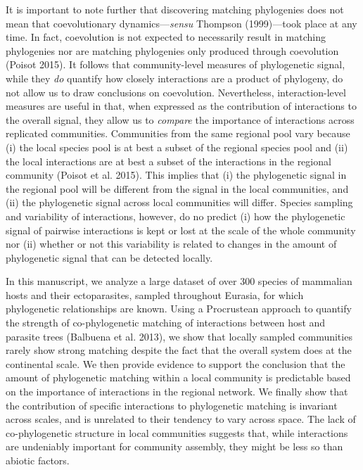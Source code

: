 \documentclass[11pt,serif]{article}
\begin{document}
It is important to note further that discovering matching phylogenies
does not mean that coevolutionary dynamics---\emph{sensu} Thompson
(1999)---took place at any time. In fact, coevolution is not expected to
necessarily result in matching phylogenies nor are matching phylogenies
only produced through coevolution (Poisot 2015). It follows that
community-level measures of phylogenetic signal, while they \emph{do}
quantify how closely interactions are a product of phylogeny, do not
allow us to draw conclusions on coevolution. Nevertheless,
interaction-level measures are useful in that, when expressed as the
contribution of interactions to the overall signal, they allow us to
\emph{compare} the importance of interactions across replicated
communities. Communities from the same regional pool vary because (i)
the local species pool is at best a subset of the regional species pool
and (ii) the local interactions are at best a subset of the interactions
in the regional community (Poisot et al. 2015). This implies that (i)
the phylogenetic signal in the regional pool will be different from the
signal in the local communities, and (ii) the phylogenetic signal across
local communities will differ. Species sampling and variability of
interactions, however, do no predict (i) how the phylogenetic signal of
pairwise interactions is kept or lost at the scale of the whole
community nor (ii) whether or not this variability is related to changes
in the amount of phylogenetic signal that can be detected locally.

In this manuscript, we analyze a large dataset of over 300 species of
mammalian hosts and their ectoparasites, sampled throughout Eurasia, for
which phylogenetic relationships are known. Using a Procrustean approach
to quantify the strength of co-phylogenetic matching of interactions
between host and parasite trees (Balbuena et al. 2013), we show that
locally sampled communities rarely show strong matching despite the fact
that the overall system does at the continental scale. We then provide
evidence to support the conclusion that the amount of phylogenetic
matching within a local community is predictable based on the importance
of interactions in the regional network. We finally show that the
contribution of specific interactions to phylogenetic matching is
invariant across scales, and is unrelated to their tendency to vary
across space. The lack of co-phylogenetic structure in local communities
suggests that, while interactions are undeniably important for community
assembly, they might be less so than abiotic factors.
\end{document}
